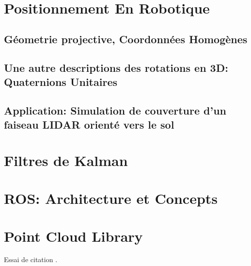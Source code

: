 \documentclass[12pt,a4paper]{report}
\begin{document}
\begin{appendix}
	\chapter{Positionnement En Robotique}
		\section{Géometrie projective, Coordonnées Homogènes}
		\section{Une autre descriptions des rotations en 3D: Quaternions Unitaires}
		\section{Application: Simulation de couverture d'un faiseau LIDAR orienté vers le sol}
	
	\chapter{Filtres de Kalman}
	
	\chapter{ROS: Architecture et Concepts}
	
	\chapter{Point Cloud Library}
	Essai de citation \cite{kaplan_understanding_2006}.

\end{appendix}

\nocite{*}


\end{document}
